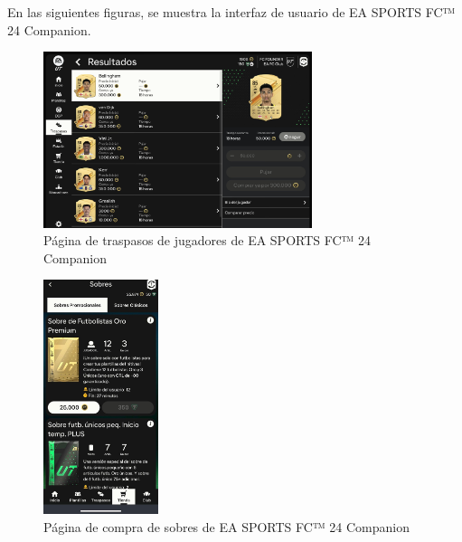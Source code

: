 En las siguientes figuras, se muestra la interfaz de usuario de EA SPORTS FC™ 24 Companion.

\begin{figure}[H]
    \centering
    \includegraphics[width=0.7\textwidth]{figures/4-Estudio-viabilidad/4_FC_Companion.png}
    \caption{Página de traspasos de jugadores de EA SPORTS FC™ 24 Companion}
    \label{fig:ea_sports_fc_1}
    \hypertarget{fig:ea_sports_fc_1}{}
\end{figure}

\begin{figure}[H]
    \centering
    \includegraphics[width=0.3\textwidth]{figures/4-Estudio-viabilidad/4_FC_Companion2.jpeg}
    \caption{Página de compra de sobres de EA SPORTS FC™ 24 Companion}
    \label{fig:ea_sports_fc_2}
    \hypertarget{fig:ea_sports_fc_2}{}
\end{figure}

